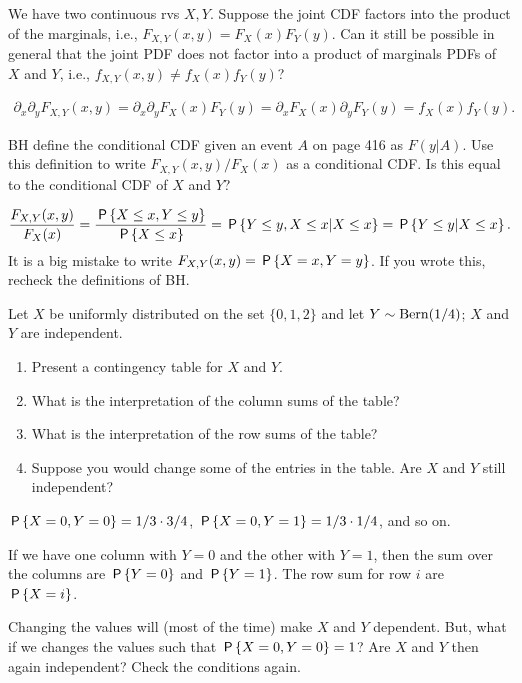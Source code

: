 \begin{exercise}
We have two continuous rvs $X, Y$.
Suppose the joint CDF factors into the product of the marginals, i.e., $F_{X,Y}(x,y) = F_X(x)F_Y(y)$. Can it still be possible in general that the joint PDF does not factor into a product of marginals PDFs of $X$ and $Y$, i.e., $f_{X,Y}(x,y) \neq f_X(x) f_Y(y)$?
\begin{solution}
\begin{align*}
\partial_{x}\partial_{y}F_{X,Y}(x,y)
=\partial_{x}\partial_{y}F_{X}(x) F_{Y}(y)
=\partial_{x}F_{X}(x) \partial_{y} F_{Y}(y) = f_{X}(x) f_{Y}(y).
\end{align*}
\end{solution}
\end{exercise}

\begin{exercise}
BH define the conditional CDF given an event $A$ on page 416 as $F(y|A)$.
Use this definition to write $F_{X,Y}(x,y)/F_{X}(x)$ as a conditional CDF.
Is this equal to the conditional CDF of $X$ and $Y$?
\begin{solution}
\begin{align}
\frac{F_{X,Y}(x,y)}{F_{X}(x)} = \frac{\P{X\leq x, Y\leq y}}{\P{X\leq x}}
  = \P{Y\leq y, X\leq x|X\leq x} = \P{Y\leq y|X\leq x}.
\end{align}
It is a big mistake to write $F_{X,Y}(x,y) = \P{X=x, Y=y}$. If you wrote this, recheck the definitions of BH.
\end{solution}
\end{exercise}

\begin{exercise}
Let $X$ be uniformly distributed on the set $\{0,1,2\}$ and let $Y \sim \Bern{1/4}$; $X$ and $Y$ are independent.
\begin{enumerate}
\item Present a contingency table for $X$ and $Y$.
\item What is the interpretation of the column sums of the table?
\item What is the interpretation of the row sums of the table?
\item Suppose you would change some of the entries in the table. Are $X$ and $Y$ still independent?
\end{enumerate}
\begin{solution}
$\P{X=0, Y=0} = 1/3 \cdot 3/4$,
$\P{X=0, Y=1} = 1/3 \cdot 1/4$, and so on.

If we have one column with $Y=0$ and the other with $Y=1$, then the sum over the columns are $\P{Y=0}$ and $\P{Y=1}$. The row sum for row $i$ are  $\P{X=i}$.

Changing the values will (most of the time) make $X$ and $Y$ dependent. But, what if we changes the values such that  $\P{X=0, Y=0} =1$? Are $X$ and $Y$ then again independent? Check the conditions again.
\end{solution}
\end{exercise}

